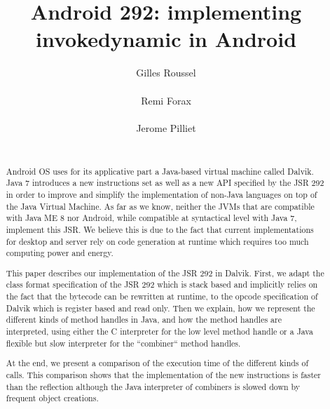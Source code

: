 \documentclass{sig-alternate}
\def \Jsr{JSR\xspace}
\def \JSR{\Jsr 292\xspace}
\def \ANDROID{Android\xspace}
\begin{document}
\title{Android 292: implementing invokedynamic in Android}

\author{
  \alignauthor Gilles Roussel\\
    \\
  \alignauthor Remi Forax\\
    \\
  \alignauthor Jerome Pilliet\\
    \\
}


\maketitle

\begin{abstract}
\ANDROID OS uses for its applicative part a Java-based virtual machine called Dalvik.
Java 7 introduces a new instructions set as well as a new API  specified by the \JSR
in order to improve and simplify the implementation of non-Java languages on top of the Java Virtual Machine.
As far as we know, neither the JVMs that are compatible with Java ME 8 nor
\ANDROID, while compatible at syntactical level with Java 7, implement this \Jsr.
We believe this is due to the fact that current implementations for desktop and server rely
on code generation at runtime which requires too much computing power and energy.

This paper describes our implementation of the \JSR in Dalvik.
First, we adapt the class format specification of the \JSR which is stack based and implicitly relies on the fact that the bytecode
can be rewritten at runtime, to the opcode specification of Dalvik which is register based and read only. 
Then we explain, how we represent the different kinds of method handles in Java, and how the method handles are interpreted,
using either the C interpreter for the low level method handle or a Java flexible but slow interpreter for the ``combiner`` method handles.

At the end, we present a comparison of the execution time of the different kinds of calls.
This comparison shows that the implementation of the new instructions is faster than the reflection
although the Java interpreter of combiners is slowed down by frequent object creations.
\end{abstract}
\end{document}
